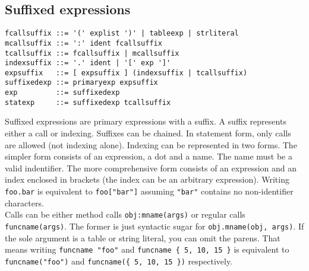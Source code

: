\documentclass{article}
\begin{document}
\subsection{Suffixed expressions}
\begin{lstlisting}[language=bnf]
fcallsuffix ::= '(' explist ')' | tableexp | strliteral
mcallsuffix ::= ':' ident fcallsuffix
tcallsuffix ::= fcallsuffix | mcallsuffix
indexsuffix ::= '.' ident | '[' exp ']'
expsuffix   ::= [ expsuffix ] (indexsuffix | tcallsuffix)
suffixedexp ::= primaryexp expsuffix
exp         ::= suffixedexp
statexp     ::= suffixedexp tcallsuffix
\end{lstlisting}
Suffixed expressions are primary expressions with a suffix. A suffix
represents either a call or indexing. Suffixes can be chained. In statement
form, only calls are allowed (not indexing alone). Indexing can be represented
in two forms. The simpler form consists of an expression, a dot and a name.
The name must be a valid indentifier. The more comprehensive form consists
of an expression and an index enclosed in brackets (the index can be an
arbitrary expression). Writing \verb|foo.bar| is equivalent to
\verb|foo["bar"]| assuming \verb|"bar"| contains no non-identifier
characters.\\
Calls can be either method calls \verb|obj:mname(args)| or regular
calls \verb|funcname(args)|. The former is just syntactic sugar for
\verb|obj.mname(obj, args)|. If the sole argument is a table or string literal,
you can omit the parens. That means writing \verb|funcname "foo"| and
\verb|funcname { 5, 10, 15 }| is equivalent to \verb|funcname("foo")| and
\verb|funcname({ 5, 10, 15 })| respectively.
\end{document}

